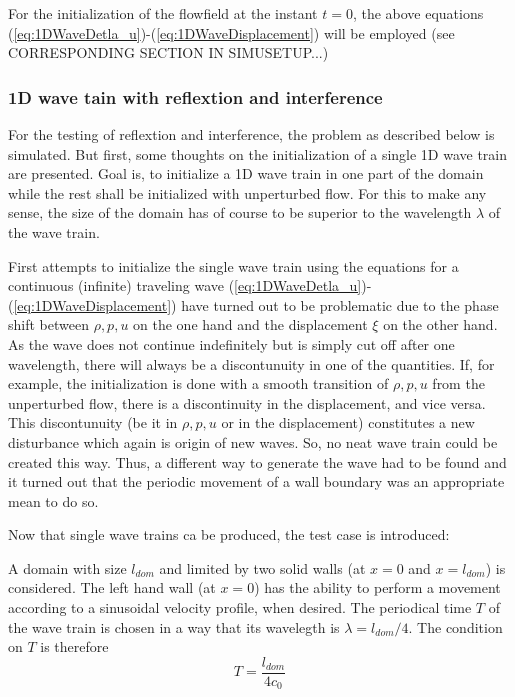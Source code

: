 \documentclass{report}
\begin{document}
For the initialization of the flowfield at the instant $t=0$, the above equations (\ref{eq:1DWaveDetla_u})-(\ref{eq:1DWaveDisplacement}) will be employed (see CORRESPONDING SECTION IN SIMUSETUP...)


\subsubsection{1D wave tain with reflextion and interference}
For the testing of reflextion and interference, the problem as described below is simulated.
But first, some thoughts on the initialization of a single 1D wave train are presented.
Goal is, to initialize a 1D wave train in one part of the domain while the rest shall be initialized with unperturbed flow. For this to make any sense, the size of the domain has of course to be superior to the wavelength $\lambda$ of the wave train. 

First attempts to initialize the single wave train using the equations for a continuous (infinite) traveling wave (\ref{eq:1DWaveDetla_u})-(\ref{eq:1DWaveDisplacement}) have turned out to be problematic due to the phase shift between $\rho,p,u$ on the one hand and the displacement $\xi$ on the other hand. As the wave does not continue indefinitely but is simply cut off after one wavelength, there will always be a discontunuity in one of the quantities.  If, for example, the initialization is done with a smooth transition of $\rho,p,u$ from the unperturbed flow, there is a discontinuity in the displacement, and vice versa. This discontunuity (be it in $\rho,p,u$ or in the displacement) constitutes a new disturbance which again is origin of new waves. So, no neat wave train could be created this way. 
Thus, a different way to generate the wave had to be found and it turned out that the periodic movement of a wall boundary was an appropriate mean to do so. 

Now that single wave trains ca be produced, the test case is introduced:

A domain with size $l_{\mathit{dom}}$ and limited by two solid walls (at $x=0$ and $x=l_{\mathit{dom}}$) is considered. The left hand wall (at $x=0$) has the ability to perform a movement according to a sinusoidal velocity profile, when desired.
The periodical time $T$ of the wave train is chosen in a way that its wavelegth is
$\lambda=l_{\mathit{dom}}/4$. The condition on $T$ is therefore
\begin{equation}
 T=\frac{l_{\mathit{dom}}}{4 c_0}
\end{equation}
\end{document}
